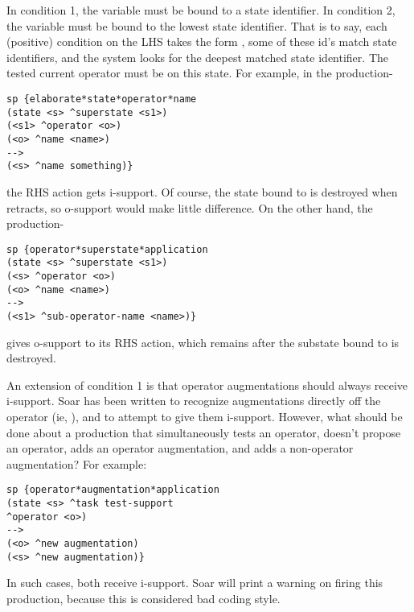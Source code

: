 In condition 1, the variable  must be bound to a state identifier.
In condition 2, the variable  must be bound to the lowest state identifier. That is to say, each (positive) condition on the LHS takes the form , some of these id's match state identifiers, and the system looks for the deepest matched state identifier. The tested current operator must be on this state. For example, in the production-

\begin{verbatim}
sp {elaborate*state*operator*name
(state <s> ^superstate <s1>)
(<s1> ^operator <o>)
(<o> ^name <name>)
-->
(<s> ^name something)}
\end{verbatim}


the RHS action gets i-support. Of course, the state bound to  is destroyed when  retracts, so o-support would make little difference. On the other hand, the production- 

\begin{verbatim}
sp {operator*superstate*application
(state <s> ^superstate <s1>)
(<s> ^operator <o>)
(<o> ^name <name>)
-->
(<s1> ^sub-operator-name <name>)}
\end{verbatim}

gives o-support to its RHS action, which remains after the substate bound to  is destroyed. 

An extension of condition 1 is that operator augmentations should always receive i-support. Soar has been written to recognize augmentations directly off the operator (ie, ), and to attempt to give them i-support. However, what should be done about a production that simultaneously tests an operator, doesn't propose an operator, adds an operator augmentation, and adds a non-operator augmentation? For example:

\begin{verbatim}
sp {operator*augmentation*application
(state <s> ^task test-support
^operator <o>)
-->
(<o> ^new augmentation)
(<s> ^new augmentation)}
\end{verbatim}


In such cases, both receive i-support. Soar will print a warning on firing this production, because this is considered bad coding style.

